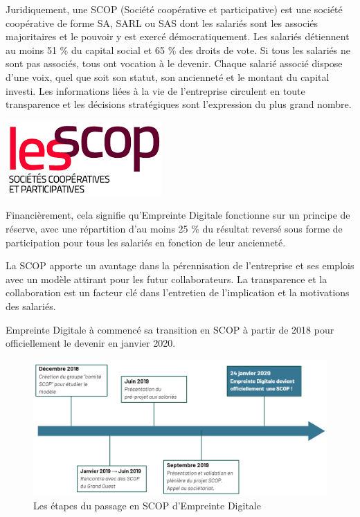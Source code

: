 \documentclass[12pt]{article}
\begin{document}
\noindent%
\begin{minipage}{.7\textwidth}%
Juridiquement, une SCOP (Société coopérative et participative) est une société coopérative de forme SA, SARL ou SAS dont les salariés sont les associés majoritaires et le pouvoir y est exercé démocratiquement.
Les salariés détiennent au moins 51 \% du capital social et 65 \% des droits de vote. 
Si tous les salariés ne sont pas associés, tous ont vocation à le devenir. 
Chaque salarié associé dispose d’une voix, quel que soit son statut, son ancienneté et le montant du capital investi.
Les informations liées à la vie de l’entreprise circulent en toute transparence et les décisions stratégiques sont l’expression du plus grand nombre.  \\
\end{minipage}%
\hfill
\begin{minipage}{.3\textwidth}%
\begin{center}
    \includegraphics[scale=0.7]{src/scop.png}
\end{center}
\end{minipage}%

Financièrement, cela signifie qu'Empreinte Digitale fonctionne sur un principe de réserve, avec une répartition d'au moins 25 \% du résultat reversé sous forme de participation pour tous les salariés en fonction de leur ancienneté.

La SCOP apporte un avantage dans la pérennisation de l'entreprise et ses emplois avec un modèle attirant pour les futur collaborateurs. 
La transparence et la collaboration est un facteur clé dans l'entretien de l'implication et la motivations des salariés.

Empreinte Digitale à commencé sa transition en \gls{SCOP} à partir de 2018 pour officiellement le devenir en janvier 2020.
\begin{figure}[!ht]
    \centering
    \includegraphics[width=\textwidth]{src/transition_scop.png}
    \caption{Les étapes du passage en SCOP d'Empreinte Digitale}
    \label{fig:transition_scop}
\end{figure}
\end{document}
